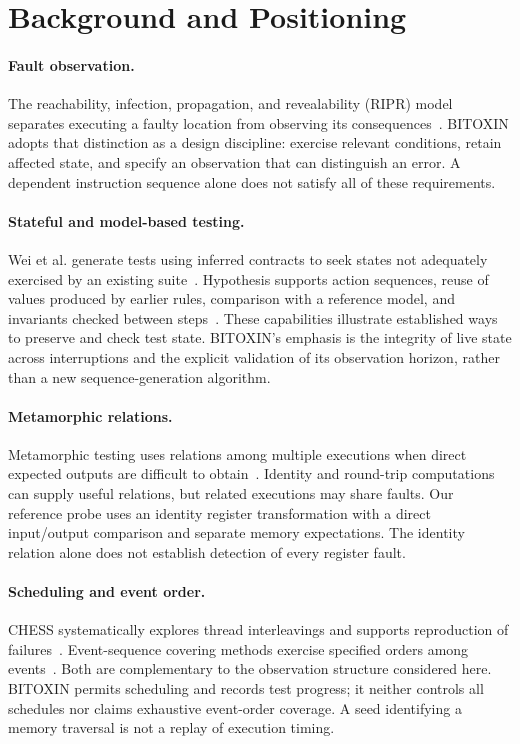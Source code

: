 \documentclass[10pt,twocolumn,letterpaper]{article}
\begin{document}
\section{Background and Positioning}
\paragraph{Fault observation.}
The reachability, infection, propagation, and revealability (RIPR) model separates executing a faulty location from observing its consequences~\cite{ammann2017}. BITOXIN adopts that distinction as a design discipline: exercise relevant conditions, retain affected state, and specify an observation that can distinguish an error. A dependent instruction sequence alone does not satisfy all of these requirements.

\paragraph{Stateful and model-based testing.}
Wei et al. generate tests using inferred contracts to seek states not adequately exercised by an existing suite~\cite{wei2011}. Hypothesis supports action sequences, reuse of values produced by earlier rules, comparison with a reference model, and invariants checked between steps~\cite{hypothesis}. These capabilities illustrate established ways to preserve and check test state. BITOXIN's emphasis is the integrity of live state across interruptions and the explicit validation of its observation horizon, rather than a new sequence-generation algorithm.

\paragraph{Metamorphic relations.}
Metamorphic testing uses relations among multiple executions when direct expected outputs are difficult to obtain~\cite{chen2018}. Identity and round-trip computations can supply useful relations, but related executions may share faults. Our reference probe uses an identity register transformation with a direct input/output comparison and separate memory expectations. The identity relation alone does not establish detection of every register fault.

\paragraph{Scheduling and event order.}
CHESS systematically explores thread interleavings and supports reproduction of failures~\cite{chess2008}. Event-sequence covering methods exercise specified orders among events~\cite{kuhn2012}. Both are complementary to the observation structure considered here. BITOXIN permits scheduling and records test progress; it neither controls all schedules nor claims exhaustive event-order coverage. A seed identifying a memory traversal is not a replay of execution timing.
\end{document}
